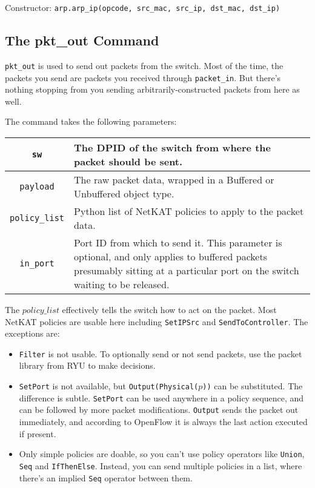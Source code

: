 \bigskip
Constructor: \texttt{arp.arp\_ip(opcode, src\_mac, src\_ip, dst\_mac, dst\_ip)}

\subsection{The pkt\_out Command}

\texttt{pkt\_out} is used to send out packets from the switch.  
Most of the time, the packets you send are packets you received through \texttt{packet\_in}.
But there's nothing stopping from you sending arbitrarily-constructed packets from here as well.  

The command takes the following parameters:

\bigskip
\begin{tabularx}{6in}{|c|X|}
\hline\hline
\texttt{sw} & The DPID of the switch from where the packet should be sent.
\\ \hline
\texttt{payload} & The raw packet data, wrapped in a 
Buffered or Unbuffered object type.
\\ \hline
\texttt{policy\_list} & Python list of NetKAT policies to apply to the packet data.
\\ \hline
\texttt{in\_port} & Port ID from which to send it.
This parameter is optional, and only applies to buffered packets presumably sitting at a particular port on
the switch waiting to be released.
\\ \hline\hline
\end{tabularx}

\bigskip

The $policy\_list$ effectively tells the switch how to act on the packet.  
Most NetKAT policies are usable here including \texttt{SetIPSrc} and \texttt{SendToController}.  The
exceptions are:

\begin{itemize}
  \item \texttt{Filter} is not usable.  To optionally send or not send packets, use the packet library
  from RYU to make decisions.  
  \item \texttt{SetPort} is not available, but \texttt{Output(Physical($p$))} can be substituted.  The 
  difference is subtle.  \texttt{SetPort} can be used anywhere in a policy sequence, and can be followed
  by more packet modifications.  \texttt{Output} sends the packet out immediately, and according to OpenFlow
  it is always the last action executed if present.   
  \item Only simple policies are doable, so you can't use policy operators like \texttt{Union}, \texttt{Seq} 
  and \texttt{IfThenElse}.  Instead, you can send multiple policies in a list, where there's an implied \texttt{Seq} 
  operator between them.
\end{itemize}

